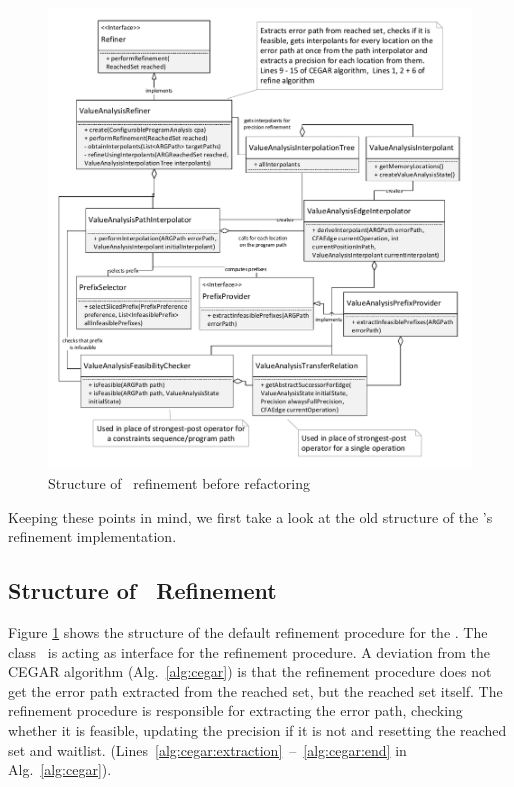 \begin{figure}
\centering
\includegraphics[width=\linewidth]{implementationCegar/ValueAnalysisRefinementBefore}
\caption{Structure of \ refinement before refactoring}
\label{fig:valRefinementBefore}
\end{figure}

Keeping these points  in mind, we first take a look at the old structure of the 's refinement implementation.

\subsection{Structure of \ValueAnalysisCPA\ Refinement}
Figure \ref{fig:valRefinementBefore} shows the structure of the default refinement procedure for the .
The class \ is acting as interface for the refinement procedure.
A deviation from the CEGAR algorithm (Alg.~\ref{alg:cegar}) is that the refinement procedure does not get the error path extracted from the reached set, but the reached set itself.
The refinement procedure is responsible for extracting the error path, checking whether it is feasible, updating the precision if it is not and resetting the reached set and waitlist. (Lines~\ref{alg:cegar:extraction}~--~\ref{alg:cegar:end} in Alg.~\ref{alg:cegar}).

